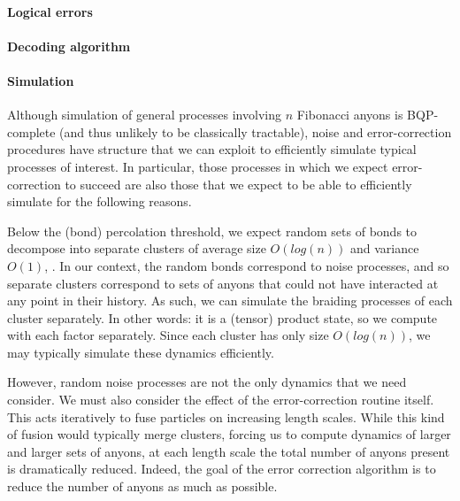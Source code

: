 \documentclass[aps, prl, letterpaper, twocolumn, superscriptaddress, notitlepage]{revtex4-1}
\begin{document}

\paragraph{Logical errors}


\paragraph{Decoding algorithm}



\paragraph{Simulation}

Although simulation of general processes involving $n$ Fibonacci anyons is BQP-complete (and thus unlikely to be classically tractable), noise and error-correction procedures have structure that we can exploit to efficiently simulate typical processes of interest. In particular, those processes in which we expect error-correction to succeed are also those that we expect to be able to efficiently simulate for the following reasons.

Below the (bond) percolation threshold, we expect random sets of bonds to decompose into separate clusters of average size $O(log(n))$ and variance $O(1)$, \cite{Bazant2000}. In our context, the random bonds correspond to noise processes, and so separate clusters correspond to sets of anyons that could not have interacted at any point in their history. As such, we can simulate the braiding processes of each cluster separately. In other words: it is a (tensor) product state, so we compute with each factor separately. Since each cluster has only size $O(log(n))$, we may typically simulate these dynamics efficiently. 

However, random noise processes are not the only dynamics that we need consider. We must also consider the effect of the error-correction routine itself. This acts iteratively to fuse particles on increasing length scales. While this kind of fusion would typically merge clusters, forcing us to compute dynamics of larger and larger sets of anyons, at each length scale the total number of anyons present is dramatically reduced. Indeed, the goal of the error correction algorithm is to reduce the number of anyons as much as possible.
\end{document}
